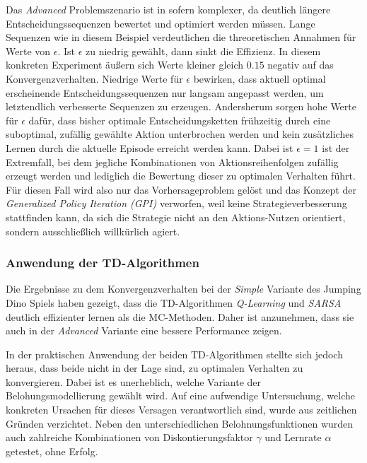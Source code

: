 Das \textit{Advanced} Problemszenario ist in sofern komplexer, da deutlich längere Entscheidungssequenzen bewertet und optimiert werden müssen. Lange Sequenzen wie in diesem Beispiel verdeutlichen die threoretischen Annahmen für Werte von $\epsilon$. Ist $\epsilon$ zu niedrig gewählt, dann sinkt die Effizienz. In diesem konkreten Experiment äußern sich Werte kleiner gleich $0.15$ negativ auf das Konvergenzverhalten. Niedrige Werte für $\epsilon$ bewirken, dass aktuell optimal erscheinende Entscheidungssequenzen nur langsam angepasst werden, um letztendlich verbesserte Sequenzen zu erzeugen. Andersherum sorgen hohe Werte für $\epsilon$ dafür, dass bisher optimale Entscheidungsketten frühzeitig durch eine suboptimal, zufällig gewählte Aktion unterbrochen werden und kein zusätzliches Lernen durch die aktuelle Episode erreicht werden kann. Dabei ist $\epsilon = 1$ ist der Extremfall, bei dem jegliche Kombinationen von Aktionsreihenfolgen zufällig erzeugt werden und lediglich die Bewertung dieser zu optimalen Verhalten führt. Für diesen Fall wird also nur das Vorhersageproblem gelöst und das Konzept der \textit{Generalized Policy Iteration (GPI)} verworfen, weil keine Strategieverbesserung stattfinden kann, da sich die Strategie nicht an den Aktions-Nutzen orientiert, sondern ausschließlich willkürlich agiert.
\subsubsection*{Anwendung der TD-Algorithmen}
Die Ergebnisse zu dem Konvergenzverhalten bei der \textit{Simple} Variante des Jumping Dino Spiels haben gezeigt, dass die TD-Algorithmen \textit{Q-Learning} und \textit{SARSA} deutlich effizienter lernen als die MC-Methoden. Daher ist anzunehmen, dass sie auch in der \textit{Advanced} Variante eine bessere Performance zeigen.
\par 
In der praktischen Anwendung der beiden TD-Algorithmen stellte sich jedoch heraus, dass beide nicht in der Lage sind, zu optimalen Verhalten zu konvergieren. Dabei ist es unerheblich, welche Variante der Belohungsmodellierung gewählt wird. Auf eine aufwendige  Untersuchung, welche konkreten Ursachen für dieses Versagen verantwortlich sind, wurde aus zeitlichen Gründen verzichtet. Neben den unterschiedlichen Belohnungsfunktionen wurden auch zahlreiche Kombinationen von Diskontierungsfaktor $\gamma$ und Lernrate $\alpha$ getestet, ohne Erfolg.
\par 

